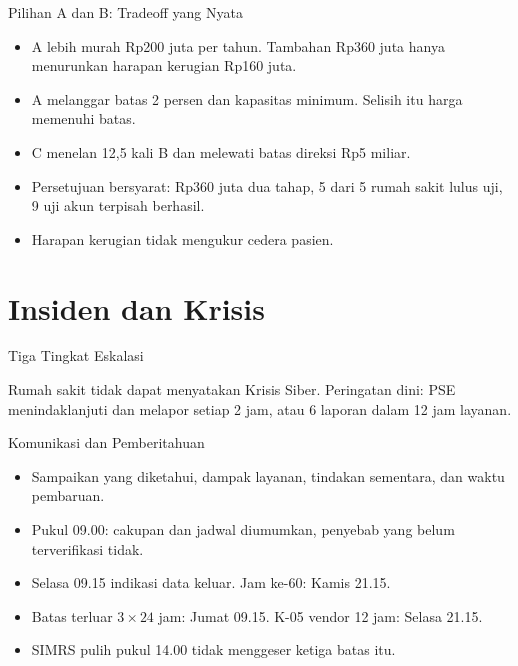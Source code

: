 \documentclass[aspectratio=169, table, 12pt]{beamer}
\begin{document}
\begin{frame}{{\Large Pilihan A dan B: Tradeoff yang Nyata}}
  \vspace{6pt}
  \small
  \begin{itemize}
    \item A lebih murah Rp200 juta per tahun. Tambahan Rp360 juta hanya menurunkan harapan kerugian
          Rp160 juta.
    \item A melanggar batas 2 persen dan kapasitas minimum. Selisih itu harga memenuhi batas.
    \item C menelan 12,5 kali B dan melewati batas direksi Rp5 miliar.
    \item Persetujuan bersyarat: Rp360 juta dua tahap, 5 dari 5 rumah sakit lulus uji, 9 uji akun
          terpisah berhasil.
    \item Harapan kerugian tidak mengukur cedera pasien.
  \end{itemize}
\end{frame}

\section{Insiden dan Krisis}

\begin{frame}{{\Large Tiga Tingkat Eskalasi}}
  \vspace{12pt}
  \begin{center}
    \resizebox{0.95\textwidth}{!}{}
  \end{center}
  \vspace{4pt}
  \small Rumah sakit tidak dapat menyatakan Krisis Siber. Peringatan dini: PSE menindaklanjuti dan
  melapor setiap 2 jam, atau 6 laporan dalam 12 jam layanan.
\end{frame}

\begin{frame}{{\Large Komunikasi dan Pemberitahuan}}
  \vspace{6pt}
  \small
  \begin{itemize}
    \item Sampaikan yang diketahui, dampak layanan, tindakan sementara, dan waktu pembaruan.
    \item Pukul 09.00: cakupan dan jadwal diumumkan, penyebab yang belum terverifikasi tidak.
    \item Selasa 09.15 indikasi data keluar. Jam ke-60: Kamis 21.15.
    \item Batas terluar $3 \times 24$ jam: Jumat 09.15. K-05 vendor 12 jam: Selasa 21.15.
    \item SIMRS pulih pukul 14.00 tidak menggeser ketiga batas itu.
  \end{itemize}
\end{frame}
\end{document}
